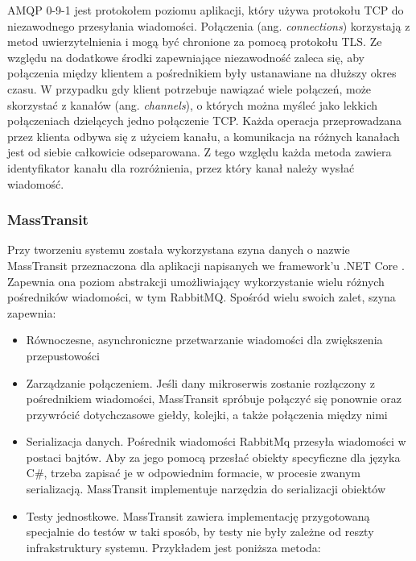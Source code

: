 AMQP 0-9-1 jest protokołem poziomu aplikacji, który używa protokołu TCP do niezawodnego 
przesyłania wiadomości. Połączenia (ang. \textit{connections}) korzystają z metod 
uwierzytelnienia i mogą być chronione za pomocą protokołu TLS. Ze względu na dodatkowe 
środki zapewniające niezawodność zaleca się, aby połączenia między klientem 
a pośrednikiem były ustanawiane na dłuższy okres czasu. W przypadku gdy klient 
potrzebuje nawiązać wiele połączeń, może skorzystać z kanałów (ang. 
\textit{channels}), o których można myśleć jako lekkich połączeniach dzielących jedno 
połączenie TCP. Każda operacja przeprowadzana przez klienta odbywa się z użyciem 
kanału, a komunikacja na różnych kanałach jest od siebie całkowicie odseparowana. 
Z tego względu każda metoda zawiera identyfikator kanału dla rozróżnienia, przez 
który kanał należy wysłać wiadomość.

\subsubsection{MassTransit}

Przy tworzeniu systemu została wykorzystana szyna danych o nazwie MassTransit 
przeznaczona dla aplikacji napisanych we framework'u .NET Core
\cite{masstransit2022}. Zapewnia ona poziom 
abstrakcji umożliwiający wykorzystanie wielu różnych pośredników wiadomości, w 
tym RabbitMQ. Spośród wielu swoich zalet, szyna zapewnia:

\begin{itemize} %
    \item Równoczesne, asynchroniczne przetwarzanie wiadomości dla zwiększenia 
    przepustowości
    \item Zarządzanie połączeniem. Jeśli dany mikroserwis zostanie rozłączony 
    z pośrednikiem wiadomości, MassTransit spróbuje połączyć się ponownie oraz 
    przywrócić dotychczasowe giełdy, kolejki, a także połączenia między nimi
    \item Serializacja danych. Pośrednik wiadomości RabbitMq przesyła wiadomości 
    w postaci bajtów. Aby za jego pomocą przesłać obiekty specyficzne dla języka 
    C\#, trzeba zapisać je w odpowiednim formacie, w procesie zwanym serializacją. 
    MassTransit implementuje narzędzia do serializacji obiektów
    \item Testy jednostkowe. MassTransit zawiera implementację przygotowaną specjalnie 
    do testów w taki sposób, by testy nie były zależne od reszty infrakstruktury 
    systemu. Przykładem jest poniższa metoda:
\end{itemize}

